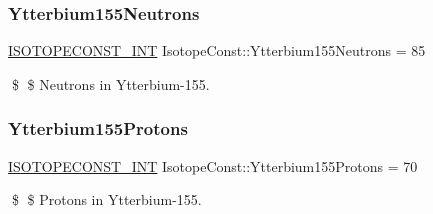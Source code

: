 \subsubsection{\texorpdfstring{Ytterbium155\+Neutrons}{Ytterbium155Neutrons}}
{\footnotesize\ttfamily \mbox{\hyperlink{group___isotope_const-_macros_ga5f18360b3e99483a35c32d789e62621c}{I\+S\+O\+T\+O\+P\+E\+C\+O\+N\+S\+T\+\_\+\+I\+NT}} Isotope\+Const\+::\+Ytterbium155\+Neutrons = 85}

\$ \$ Neutrons in Ytterbium-\/155. \mbox{\label{group___isotope_const-_ytterbium-_yb155_gaf59d3cc884b72c35e4ebee23d4e981f5}} 
\subsubsection{\texorpdfstring{Ytterbium155\+Protons}{Ytterbium155Protons}}
{\footnotesize\ttfamily \mbox{\hyperlink{group___isotope_const-_macros_ga5f18360b3e99483a35c32d789e62621c}{I\+S\+O\+T\+O\+P\+E\+C\+O\+N\+S\+T\+\_\+\+I\+NT}} Isotope\+Const\+::\+Ytterbium155\+Protons = 70}

\$ \$ Protons in Ytterbium-\/155. 